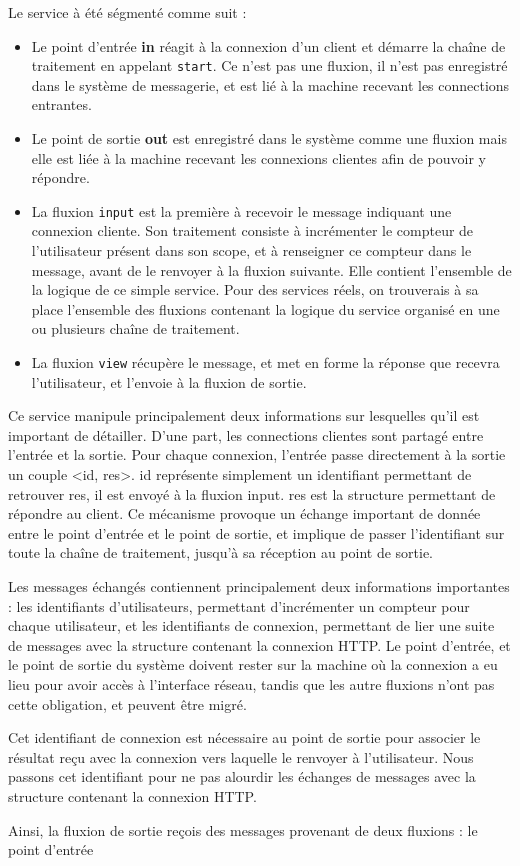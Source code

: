 Le service à été ségmenté comme suit :
\begin{itemize}
  \item[\circled{1}] Le point d'entrée \textbf{in} réagit à la connexion d'un client et démarre la chaîne de traitement en appelant \texttt{start}.
  Ce n'est pas une fluxion, il n'est pas enregistré dans le système de messagerie, et est lié à la machine recevant les connections entrantes.
  \item[\circled{4}] Le point de sortie \textbf{out} est enregistré dans le système comme une fluxion mais elle est liée à la machine recevant les connexions clientes afin de pouvoir y répondre.
  \item[\circled{2}] La fluxion \texttt{input} est la première à recevoir le message indiquant une connexion cliente. Son traitement consiste à incrémenter le compteur de l'utilisateur présent dans son scope, et à renseigner ce compteur dans le message, avant de le renvoyer à la fluxion suivante.
  Elle contient l'ensemble de la logique de ce simple service. Pour des services réels, on trouverais à sa place l'ensemble des fluxions contenant la logique du service organisé en une ou plusieurs chaîne de traitement.
  \item[\circled{3}] La fluxion \texttt{view} récupère le message, et met en forme la réponse que recevra l'utilisateur, et l'envoie à la fluxion de sortie.
\end{itemize}

Ce service manipule principalement deux informations sur lesquelles qu'il est important de détailler.
D'une part, les connections clientes sont partagé entre l'entrée et la sortie.
Pour chaque connexion, l'entrée passe directement à la sortie un couple <id, res>.
id représente simplement un identifiant permettant de retrouver res, il est envoyé à la fluxion input.
res est la structure permettant de répondre au client.
Ce mécanisme provoque un échange important de donnée entre le point d'entrée et le point de sortie, et implique de passer l'identifiant sur toute la chaîne de traitement, jusqu'à sa réception au point de sortie.

Les messages échangés contiennent principalement deux informations importantes : les identifiants d'utilisateurs, permettant d'incrémenter un compteur pour chaque utilisateur, et les identifiants de connexion, permettant de lier une suite de messages avec la structure contenant la connexion HTTP.
Le point d'entrée, et le point de sortie du système doivent rester sur la machine où la connexion a eu lieu pour avoir accès à l'interface réseau, tandis que les autre fluxions n'ont pas cette obligation, et peuvent être migré.


Cet identifiant de connexion est nécessaire au point de sortie pour associer le résultat reçu avec la connexion vers laquelle le renvoyer à l'utilisateur.
Nous passons cet identifiant pour ne pas alourdir les échanges de messages avec la structure contenant la connexion HTTP.

Ainsi, la fluxion de sortie reçois des messages provenant de deux fluxions : le point d'entrée





